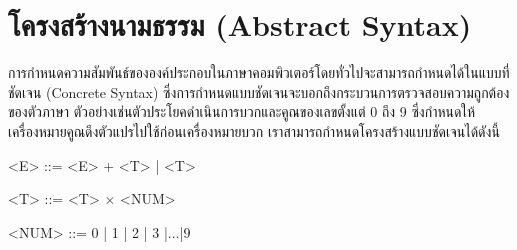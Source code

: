 \section{โครงสร้างนามธรรม (Abstract Syntax)}
%
\par{
การกำหนดความสัมพันธ์ขององค์ประกอบในภาษาคอมพิวเตอร์โดยทั่วไปจะสามารถกำหนดได้ในแบบที่ชัดเจน 
(Concrete Syntax) 
ซึ่งการกำหนดแบบชัดเจนจะบอกถึงกระบวนการตรวจสอบความถูกต้องของตัวภาษา 
ตัวอย่างเช่นตัวประโยคดำเนินการบวกและคูณของเลขตั้งแต่ 0 ถึง 9 
ซึ่งกำหนดให้เครื่องหมายคูณดึงตัวแปรไปใช้ก่อนเครื่องหมายบวก 
เราสามารถกำหนดโครงสร้างแบบชัดเจนได้ดังนี้
%
\begin{grammar}
<E> ::= <E> + <T> | <T> 

<T> ::= <T> $\times$ <NUM>  

<NUM> ::= 0 | 1 | 2 | 3 |$\ldots$|9 
\end{grammar}
%
}



